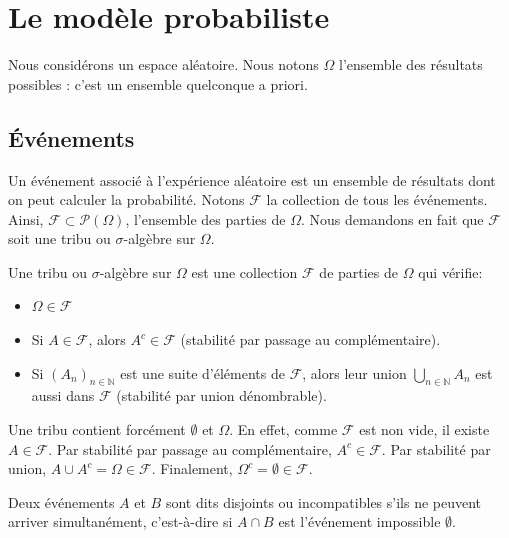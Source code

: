 \chapter{Le modèle probabiliste}
\sloppy


Nous considérons un espace aléatoire. Nous notons $\Omega$ l'ensemble des résultats possibles : c'est un ensemble quelconque a priori.
\section{Événements}
Un événement associé à l'expérience aléatoire est un ensemble de résultats dont on peut calculer la probabilité. Notons $\mathcal{F}$ la collection de tous les événements.
Ainsi, $\mathcal{F} \subset \mathcal{P}(\Omega)$, l'ensemble des parties de $\Omega$. Nous demandons en fait que $\mathcal{F}$ soit une tribu ou $\sigma$-algèbre sur $\Omega$.
\begin{definition}
Une tribu ou $\sigma$-algèbre sur $\Omega$ est une collection $\mathcal{F}$ de parties de $\Omega$ qui vérifie:
\begin{itemize}
    \item $\Omega \in \mathcal{F}$
    \item Si $A \in \mathcal{F}$, alors $A^c \in \mathcal{F}$ (stabilité par passage au complémentaire).
    \item Si $(A_n)_{n \in \mathbb{N}}$ est une suite d'éléments de $\mathcal{F}$, alors leur union $\bigcup_{n \in \mathbb{N}} A_n$ est aussi dans $\mathcal{F}$ (stabilité par union dénombrable).
\end{itemize}
\end{definition}
\begin{remark}
Une tribu contient forcément $\emptyset$ et $\Omega$.
En effet, comme $\mathcal{F}$ est non vide, il existe $A \in \mathcal{F}$. Par stabilité par passage au complémentaire, $A^c \in \mathcal{F}$. Par stabilité par union, $A \cup A^c = \Omega \in \mathcal{F}$. Finalement, $\Omega^c = \emptyset \in \mathcal{F}$.
\end{remark}
\begin{remark}[Rappel]
Deux événements $A$ et $B$ sont dits disjoints ou incompatibles s'ils ne peuvent arriver simultanément, c'est-à-dire si $A \cap B$ est l'événement impossible $\emptyset$.
\end{remark}
